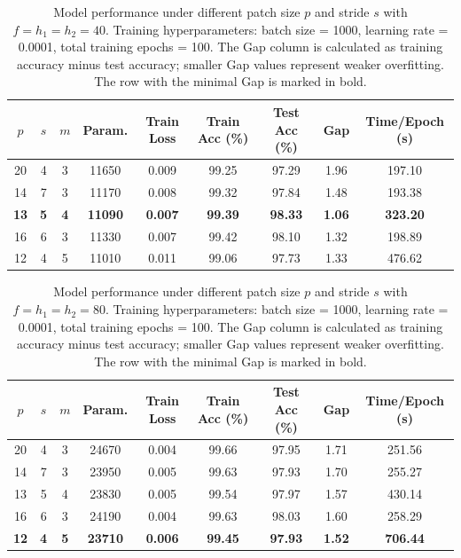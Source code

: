 \documentclass[pdflatex,sn-mathphys-num]{sn-jnl}%
\theoremstyle{thmstyleone}%
\theoremstyle{thmstyletwo}%
\theoremstyle{thmstylethree}%
\begin{document}
\begin{table}[htbp]
  \centering
  \caption{Model performance under different patch size $p$ and stride $s$ with $f=h_1=h_2=40$. Training hyperparameters: batch size = 1000, learning rate = 0.0001, total training epochs = 100. The Gap column is calculated as training accuracy minus test accuracy; smaller Gap values represent weaker overfitting. The row with the minimal Gap is marked in bold.}
  \label{tab:9}
  \begin{tabular}{ccccccccc}
    \toprule
    $p$ & $s$ & $m$ & Param. & Train Loss & Train Acc (\%) & Test Acc (\%) & Gap & Time/Epoch (s) \\ 
    \midrule
20 & 4 & 3 & 11650 & 0.009 & 99.25 & 97.29 & 1.96 & 197.10 \\
14 & 7 & 3 & 11170 & 0.008 & 99.32 & 97.84 & 1.48 & 193.38 \\
\textbf{13} & \textbf{5} & \textbf{4} & \textbf{11090} & \textbf{0.007} & \textbf{99.39} & \textbf{98.33} & \textbf{1.06} & \textbf{323.20} \\
16 & 6 & 3 & 11330 & 0.007 & 99.42 & 98.10 & 1.32 & 198.89 \\
12 & 4 & 5 & 11010 & 0.011 & 99.06 & 97.73 & 1.33 & 476.62 \\
    \bottomrule
  \end{tabular}
\end{table}

\begin{table}[htbp]
  \centering
  \caption{Model performance under different patch size $p$ and stride $s$ with $f=h_1=h_2=80$. Training hyperparameters: batch size = 1000, learning rate = 0.0001, total training epochs = 100. The Gap column is calculated as training accuracy minus test accuracy; smaller Gap values represent weaker overfitting. The row with the minimal Gap is marked in bold.}
  \label{tab:10}
  \begin{tabular}{ccccccccc}
    \toprule
    $p$ & $s$ & $m$ & Param. & Train Loss & Train Acc (\%) & Test Acc (\%) & Gap & Time/Epoch (s) \\ 
    \midrule
20 & 4 & 3 & 24670 & 0.004 & 99.66 & 97.95 & 1.71 & 251.56 \\
14 & 7 & 3 & 23950 & 0.005 & 99.63 & 97.93 & 1.70 & 255.27 \\
13 & 5 & 4 & 23830 & 0.005 & 99.54 & 97.97 & 1.57 & 430.14 \\
16 & 6 & 3 & 24190 & 0.004 & 99.63 & 98.03 & 1.60 & 258.29 \\
\textbf{12} & \textbf{4} & \textbf{5} & \textbf{23710} & \textbf{0.006} & \textbf{99.45} & \textbf{97.93} & \textbf{1.52} & \textbf{706.44} \\
    \bottomrule
  \end{tabular}
\end{table}
\end{document}
